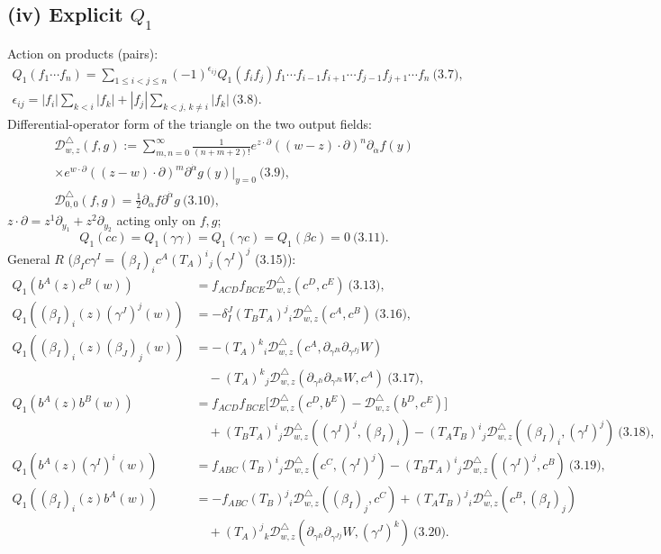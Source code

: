 \documentclass[10pt]{article}
\newcommand{\Dtri}{\mathcal D^{\triangle}_{w,z}}
\begin{document}
\subsection{(iv) Explicit $Q_1$}
Action on products (pairs):
\begin{gather*}
Q_1(f_1\cdots f_n)=\sum_{1\le i<j\le n}(-1)^{\epsilon_{ij}}Q_1(f_if_j)f_1\cdots f_{i-1}f_{i+1}\cdots f_{j-1}f_{j+1}\cdots f_n\ \text{(3.7)},\\
\epsilon_{ij}=|f_i|\sum_{k<i}|f_k|+|f_j|\sum_{k<j,\,k\neq i}|f_k|\ \text{(3.8)}.
\end{gather*}
Differential-operator form of the triangle on the two output fields:
\begin{gather*}
\Dtri(f,g):=\sum_{m,n=0}^\infty\frac1{(n+m+2)!}e^{z\cdot\partial}((w-z)\cdot\partial)^n\partial_{\dot\alpha}f(y)\\ \times e^{w\cdot\partial}((z-w)\cdot\partial)^m\partial^{\dot\alpha}g(y)\Big|_{y=0}\ \text{(3.9)},\\
\mathcal D^\triangle_{0,0}(f,g)=\tfrac12\partial_{\dot\alpha}f\partial^{\dot\alpha}g\ \text{(3.10)},
\end{gather*}
$z\cdot\partial=z^1\partial_{y_1}+z^2\partial_{y_2}$ acting only on $f,g$;
\begin{equation*}
Q_1(cc)=Q_1(\gamma\gamma)=Q_1(\gamma c)=Q_1(\beta c)=0\ \text{(3.11)}.
\end{equation*}
General $R$ ($\beta_Ic\gamma^I=(\beta_I)_ic^A(T_A)^i{}_j(\gamma^I)^j$ (3.15)):
\begin{align*}
Q_1(b^A(z)c^B(w))&=f_{ACD}f_{BCE}\Dtri(c^D,c^E)\ \text{(3.13)},\\
Q_1((\beta_I)_i(z)(\gamma^J)^j(w))&=-\delta^J_I(T_BT_A)^j{}_i\Dtri(c^A,c^B)\ \text{(3.16)},\\
Q_1((\beta_I)_i(z)(\beta_J)_j(w))&=-(T_A)^k{}_i\Dtri(c^A,\partial_{\gamma^{Ik}}\partial_{\gamma^{Jj}}W)\\&\quad-(T_A)^k{}_j\Dtri(\partial_{\gamma^{Ii}}\partial_{\gamma^{Jk}}W,c^A)\ \text{(3.17)},\\
Q_1(b^A(z)b^B(w))&=f_{ACD}f_{BCE}\big[\Dtri(c^D,b^E)-\Dtri(b^D,c^E)\big]\\
&\quad+(T_BT_A)^i{}_j\Dtri((\gamma^I)^j,(\beta_I)_i)-(T_AT_B)^i{}_j\Dtri((\beta_I)_i,(\gamma^I)^j)\ \text{(3.18)},\\
Q_1(b^A(z)(\gamma^I)^i(w))&=f_{ABC}(T_B)^i{}_j\Dtri(c^C,(\gamma^I)^j)-(T_BT_A)^i{}_j\Dtri((\gamma^I)^j,c^B)\ \text{(3.19)},\\
Q_1((\beta_I)_i(z)b^A(w))&=-f_{ABC}(T_B)^j{}_i\Dtri((\beta_I)_j,c^C)+(T_AT_B)^j{}_i\Dtri(c^B,(\beta_I)_j)\\
&\quad+(T_A)^j{}_k\Dtri(\partial_{\gamma^{Ii}}\partial_{\gamma^{Jj}}W,(\gamma^J)^k)\ \text{(3.20)}.
\end{align*}
\end{document}
